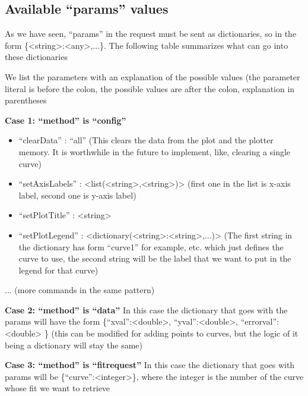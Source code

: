 \documentclass[11pt]{article} %
\begin{document}
\subsection{Available ``params'' values}

As we have seen, ``params'' in the request must be sent as dictionaries, so in the form \{<string>:<any>,...\}. The following table summarizes what can go into these dictionaries

\begin{tcolorbox}[title=Sending ``params'' to the server]

We list the parameters with an explanation of the possible values (the parameter literal is before the colon, the possible values are after the colon, explanation in parentheses

\textbf{Case 1: ``method'' is ``config''}
\begin{itemize}
\item ``clearData'' : ``all'' (This clears the data from the plot and the plotter memory. It is worthwhile in the future to implement, like, clearing a single curve)
\item ``setAxisLabels'' : <list(<string>,<string>)> (first one in the list is x-axis label, second one is y-axis label)
\item ``setPlotTitle'' : <string>
\item ``setPlotLegend'' : <dictionary(<string>:<string>,...)> (The first string in the dictionary has form ``curve1'' for example, etc. which just defines the curve to use, the second string will be the label that we want to put in the legend for that curve)
\end{itemize}
... (more commands in the same pattern)

\textbf{Case 2: ``method'' is ``data''}
In this case the dictionary that goes with the params will have the form \{``xval'':<double>, ``yval'':<double>, ``errorval'': <double> \}
(this can be modified for adding points to curves, but the logic of it being a dictionary will stay the same)

\textbf{Case 3: ``method'' is ``fitrequest''}
In this case the dictionary that goes with params will be \{``curve'':<integer>\}, where the integer is the number of the curve whose fit we want to retrieve

\end{tcolorbox}



 
\end{document}
